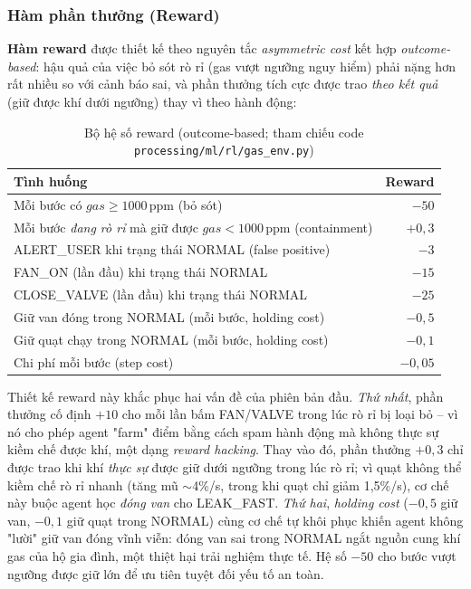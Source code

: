 \subsubsection{Hàm phần thưởng (Reward)}

\textbf{Hàm reward} được thiết kế theo nguyên tắc \textit{asymmetric cost} kết hợp \textit{outcome-based}: hậu quả của việc bỏ sót rò rỉ (gas vượt ngưỡng nguy hiểm) phải nặng hơn rất nhiều so với cảnh báo sai, và phần thưởng tích cực được trao \emph{theo kết quả} (giữ được khí dưới ngưỡng) thay vì theo hành động:
\begin{table}[H]
\centering
\caption{Bộ hệ số reward (outcome-based; tham chiếu code \texttt{processing/ml/rl/gas\_env.py})}
\label{tab:reward_shape}
\begin{tabular}{lr}
\toprule
\textbf{Tình huống} & \textbf{Reward} \\
\midrule
Mỗi bước có $gas \geq 1000$\,ppm (bỏ sót)                       & $-50$ \\
Mỗi bước \emph{đang rò rỉ} mà giữ được $gas < 1000$\,ppm (containment) & $+0{,}3$ \\
ALERT\_USER khi trạng thái NORMAL (false positive)             & $-3$ \\
FAN\_ON (lần đầu) khi trạng thái NORMAL                         & $-15$ \\
CLOSE\_VALVE (lần đầu) khi trạng thái NORMAL                    & $-25$ \\
Giữ van đóng trong NORMAL (mỗi bước, holding cost)             & $-0{,}5$ \\
Giữ quạt chạy trong NORMAL (mỗi bước, holding cost)            & $-0{,}1$ \\
Chi phí mỗi bước (step cost)                                   & $-0{,}05$ \\
\bottomrule
\end{tabular}
\end{table}

Thiết kế reward này khắc phục hai vấn đề của phiên bản đầu. \emph{Thứ nhất}, phần thưởng cố định $+10$ cho mỗi lần bấm FAN/VALVE trong lúc rò rỉ bị loại bỏ -- vì nó cho phép agent "farm" điểm bằng cách spam hành động mà không thực sự kiềm chế được khí, một dạng \textit{reward hacking}. Thay vào đó, phần thưởng $+0{,}3$ chỉ được trao khi khí \emph{thực sự} được giữ dưới ngưỡng trong lúc rò rỉ; vì quạt không thể kiềm chế rò rỉ nhanh (tăng mũ $\sim$4\%/s, trong khi quạt chỉ giảm 1{,}5\%/s), cơ chế này buộc agent học \emph{đóng van} cho LEAK\_FAST. \emph{Thứ hai}, \textit{holding cost} ($-0{,}5$ giữ van, $-0{,}1$ giữ quạt trong NORMAL) cùng cơ chế tự khôi phục khiến agent không "lười" giữ van đóng vĩnh viễn: đóng van sai trong NORMAL ngắt nguồn cung khí gas của hộ gia đình, một thiệt hại trải nghiệm thực tế. Hệ số $-50$ cho bước vượt ngưỡng được giữ lớn để ưu tiên tuyệt đối yếu tố an toàn.

